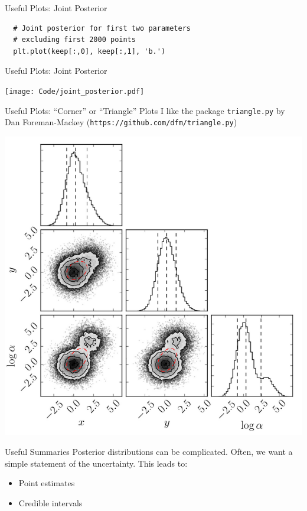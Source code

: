 \begin{frame}[t, fragile]{Useful Plots: Joint Posterior}
\begin{verbatim}
  # Joint posterior for first two parameters
  # excluding first 2000 points
  plt.plot(keep[:,0], keep[:,1], 'b.')
\end{verbatim}
\end{frame}

\begin{frame}[t]{Useful Plots: Joint Posterior}
\begin{center}
\texttt{[image: Code/joint\_posterior.pdf]}
\end{center}
\end{frame}


\begin{frame}[t]{Useful Plots: ``Corner'' or ``Triangle'' Plots}
I like the package {\tt triangle.py} by Dan Foreman-Mackey
({\tt https://github.com/dfm/triangle.py})
\begin{center}
\includegraphics[scale=0.2]{triangle.png}
\end{center}
\end{frame}


\begin{frame}[t]{Useful Summaries}
Posterior distributions can be complicated. Often, we want a simple statement
of the uncertainty. This leads to:

\begin{itemize}
\item Point estimates
\item Credible intervals
\end{itemize}
\end{frame}



